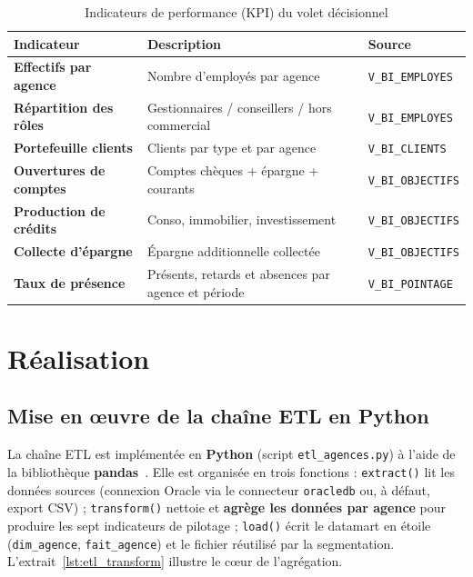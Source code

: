 \begin{table}[htbp]
\centering
\caption{Indicateurs de performance (KPI) du volet décisionnel}
\label{tab:kpi}
\renewcommand{\arraystretch}{1.25}
\begin{tabularx}{\textwidth}{>{\bfseries}p{4.2cm}Xp{2.6cm}}
\toprule
\textmd{\textbf{Indicateur}} & \textbf{Description} & \textbf{Source}\\
\midrule
Effectifs par agence & Nombre d'employés par agence & \texttt{V\_BI\_EMPLOYES}\\
Répartition des rôles & Gestionnaires / conseillers / hors commercial & \texttt{V\_BI\_EMPLOYES}\\
Portefeuille clients & Clients par type et par agence & \texttt{V\_BI\_CLIENTS}\\
Ouvertures de comptes & Comptes chèques + épargne + courants & \texttt{V\_BI\_OBJECTIFS}\\
Production de crédits & Conso, immobilier, investissement & \texttt{V\_BI\_OBJECTIFS}\\
Collecte d'épargne & Épargne additionnelle collectée & \texttt{V\_BI\_OBJECTIFS}\\
Taux de présence & Présents, retards et absences par agence et période & \texttt{V\_BI\_POINTAGE}\\
\bottomrule
\end{tabularx}
\end{table}

\section{Réalisation}

\subsection{Mise en œuvre de la chaîne ETL en Python}
La chaîne ETL est implémentée en \textbf{Python} (script \texttt{etl\_agences.py})
à l'aide de la bibliothèque \textbf{pandas}~\cite{pandas}. Elle est organisée en
trois fonctions : \texttt{extract()} lit les données sources (connexion Oracle via
le connecteur \texttt{oracledb} ou, à défaut, export CSV) ; \texttt{transform()}
nettoie et \textbf{agrège les données par agence} pour produire les sept
indicateurs de pilotage ; \texttt{load()} écrit le datamart en étoile
(\texttt{dim\_agence}, \texttt{fait\_agence}) et le fichier réutilisé par la
segmentation. L'extrait~\ref{lst:etl_transform} illustre le cœur de l'agrégation.

